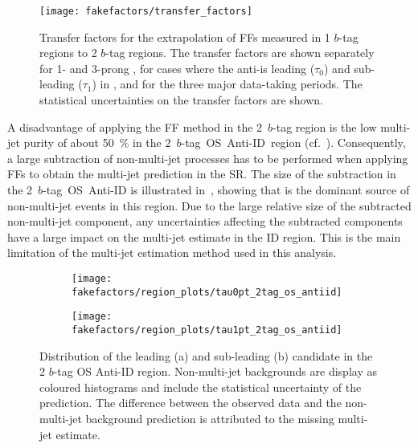 \begin{figure}[htbp]
  \centering

  \texttt{[image: fakefactors/transfer\_factors]}

  \caption[Transfer factors for the extrapolation of FFs measured in 1 $b$-tag
  regions to 2 $b$-tag regions.]{Transfer factors for the extrapolation of FFs
    measured in 1 $b$-tag regions to 2 $b$-tag regions. The transfer factors are
    shown separately for 1- and 3-prong \tauhadvis, for cases where the
    anti-\tauhadvis is leading ($\tau_0$) and sub-leading ($\tau_1$) in \pT, and
    for the three major data-taking periods.  The statistical uncertainties on
    the transfer factors are shown.}%
  \label{fig:mjfakes_transfer_factor}
\end{figure}

A disadvantage of applying the FF method in the 2~$b$-tag region is the low
multi-jet purity of about \SI{50}{\percent} in the 2~$b$-tag~OS~Anti-ID~region
(cf.\ ). Consequently, a large subtraction of
non-multi-jet processes has to be performed when applying FFs to obtain the
multi-jet prediction in the SR.  The size of the subtraction in the
2~$b$-tag~OS~Anti-ID is illustrated in~,
showing that \ttbarFakes is the dominant source of non-multi-jet events in this
region. Due to the large relative size of the subtracted non-multi-jet
component, any uncertainties affecting the subtracted components have a large
impact on the multi-jet estimate in the ID region. This is the main limitation
of the multi-jet estimation method used in this analysis.

\begin{figure}[htbp]
  \centering

  \begin{subfigure}{0.49\textwidth}
    \texttt{[image: fakefactors/region\_plots/tau0pt\_2tag\_os\_antiid]}
    \subcaption{}
  \end{subfigure}%
  \begin{subfigure}{0.49\textwidth}
    \texttt{[image: fakefactors/region\_plots/tau1pt\_2tag\_os\_antiid]}
    \subcaption{}
  \end{subfigure}

  \caption[Distribution of the leading and sub-leading \tauhadvis candidate \pT
  in the 2 $b$-tag OS Anti-ID region.]{Distribution of the leading (a) and
    sub-leading (b) \tauhadvis candidate \pT in the 2 $b$-tag OS Anti-ID
    region. Non-multi-jet backgrounds are display as coloured histograms and
    include the statistical uncertainty of the prediction. The difference
    between the observed data and the non-multi-jet background prediction is
    attributed to the missing multi-jet estimate.}%
  \label{fig:mjfakes_2tag_os_antiid}
\end{figure}


